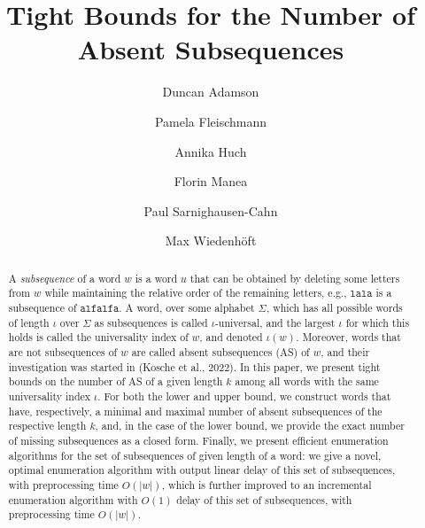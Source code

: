\documentclass[runningheads,UKenglish,cleveref, autoref, thm-restate]{llncs}
\begin{document}
	\title{Tight Bounds for the Number of Absent Subsequences}
	\author{ Duncan Adamson \and
		Pamela Fleischmann \and
		Annika Huch \and
		Florin Manea \and
		Paul Sarnighausen-Cahn \and
		Max Wiedenhöft
		}
	\maketitle              %

\begin{abstract}
A {\em subsequence} of a word $w$ is a word $u$ that can be obtained by deleting some letters from $w$ while maintaining the relative order of the remaining letters, e.g., $\mathtt{lala}$ is a subsequence of $\mathtt{alfalfa}$. A word, over some alphabet $\Sigma$, which has all possible words of length $\iota$ over $\Sigma$ as subsequences is called $\iota$-universal, and the largest $\iota$ for which this holds is called the universality index of $w$, and denoted $\iota(w)$. Moreover, words that are not subsequences of $w$ are called absent subsequences (AS) of $w$, and their investigation was started in (Kosche et al., 2022). In this paper, we present tight bounds 
on the number of AS of a given length $k$ among all words with the same universality index $\iota$. For both the lower and upper bound, we construct words that have, respectively, a minimal and maximal number of absent subsequences of the respective length $k$, and, in the case of the lower bound, we provide the exact number of missing subsequences as a closed form. Finally, we present efficient enumeration algorithms for the set of subsequences of given length of a word: we give a novel, optimal enumeration algorithm with output linear delay of this set of subsequences, with preprocessing time $O(|w|)$, which is further improved to an incremental enumeration algorithm with $O(1)$ delay of this set of subsequences, with preprocessing time $O(|w|)$.
\end{abstract}
\end{document}
